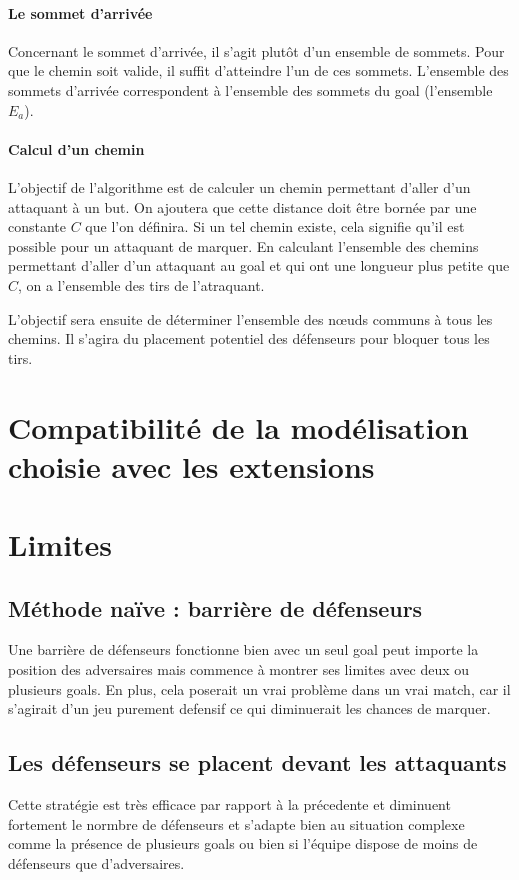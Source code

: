 \documentclass{article}
\begin{document}
\paragraph{Le sommet d'arrivée}
Concernant le sommet d'arrivée, il s'agit plutôt d'un ensemble de sommets. Pour que le chemin soit valide, il suffit d'atteindre l'un de ces sommets. L'ensemble des sommets d'arrivée correspondent à l'ensemble des sommets du goal (l'ensemble $E_a$).

\paragraph{Calcul d'un chemin}
L'objectif de l'algorithme est de calculer un chemin permettant d'aller d'un attaquant à un but. On ajoutera que cette distance doit être bornée par une constante $C$ que l'on définira. Si un tel chemin existe, cela signifie qu'il est possible pour un attaquant de marquer. En calculant l'ensemble des chemins permettant d'aller d'un attaquant au goal et qui ont une longueur plus petite que $C$, on a l'ensemble des tirs de l'atraquant.

L'objectif sera ensuite de déterminer l'ensemble des n\oe uds communs à tous les chemins. Il s'agira du placement potentiel des défenseurs pour bloquer tous les tirs.

\section{Compatibilité de la modélisation choisie avec les extensions}



\section{Limites}

\subsection{Méthode naïve : barrière de défenseurs}
Une barrière de défenseurs fonctionne bien avec un seul goal peut importe la position des adversaires
mais commence à montrer ses limites avec deux ou plusieurs goals.
En plus, cela poserait un vrai problème dans un vrai match, car il s'agirait d'un jeu purement defensif
ce qui diminuerait les chances de marquer.

\subsection{Les défenseurs se placent devant les attaquants}
Cette stratégie est très efficace par rapport à la précedente et diminuent fortement le normbre de défenseurs et
s'adapte bien au situation complexe comme la présence de plusieurs goals ou bien si l'équipe dispose de moins de
défenseurs que d'adversaires.
\end{document}

